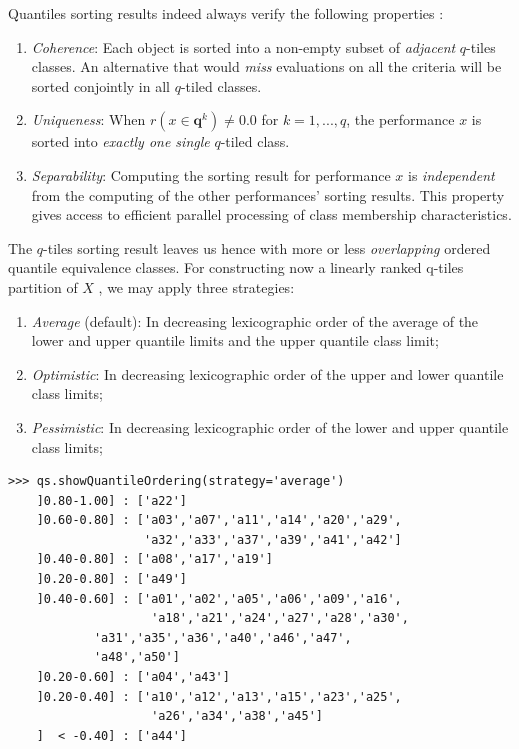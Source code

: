 Quantiles sorting results indeed always verify the following properties \citep{ADT-L10}:
\begin{property}\label{prop:9.1}
\begin{enumerate}[leftmargin=0.5cm,rightmargin=0.5cm,topsep=1pt]
\item \emph{Coherence}: Each object is sorted into a non-empty subset of \emph{adjacent} $q$-tiles classes. An alternative that would \emph{miss} evaluations on all the criteria will be sorted conjointly in all $q$-tiled classes.
\item \emph{Uniqueness}: When $r(x \in \mathbf{q}^k) \neq 0.0$  for $k = 1, ..., q$, the performance $x$ is sorted into \emph{exactly one single} $q$-tiled class.
\item \emph{Separability}: Computing the sorting result for performance $x$ is \emph{independent} from the computing of the other performances’ sorting results. This property gives access to efficient parallel processing of class membership characteristics.
\end{enumerate}
\end{property}

The $q$-tiles sorting result leaves us hence with more or less \emph{overlapping} ordered quantile equivalence classes. For constructing now a linearly ranked q-tiles partition of $X$ , we may apply three strategies:
\begin{enumerate}[leftmargin=0.5cm,rightmargin=0.5cm,topsep=1pt]
\item \emph{Average} (default): In decreasing lexicographic order of the average of the lower and upper quantile limits and the upper quantile class limit;
\item \emph{Optimistic}: In decreasing lexicographic order of the upper and lower quantile class limits;
\item \emph{Pessimistic}: In decreasing lexicographic order of the lower and upper quantile class limits;
\end{enumerate}
\begin{lstlisting}[caption={Weakly ranking the quintiles sorting result},label=list:9.3]
>>> qs.showQuantileOrdering(strategy='average')
    ]0.80-1.00] : ['a22']
    ]0.60-0.80] : ['a03','a07','a11','a14','a20','a29',
                   'a32','a33','a37','a39','a41','a42']
    ]0.40-0.80] : ['a08','a17','a19']
    ]0.20-0.80] : ['a49']
    ]0.40-0.60] : ['a01','a02','a05','a06','a09','a16',
                    'a18','a21','a24','a27','a28','a30',
		    'a31','a35','a36','a40','a46','a47',
		    'a48','a50']
    ]0.20-0.60] : ['a04','a43']
    ]0.20-0.40] : ['a10','a12','a13','a15','a23','a25',
                    'a26','a34','a38','a45']
    ]  < -0.40] : ['a44']
\end{lstlisting}

